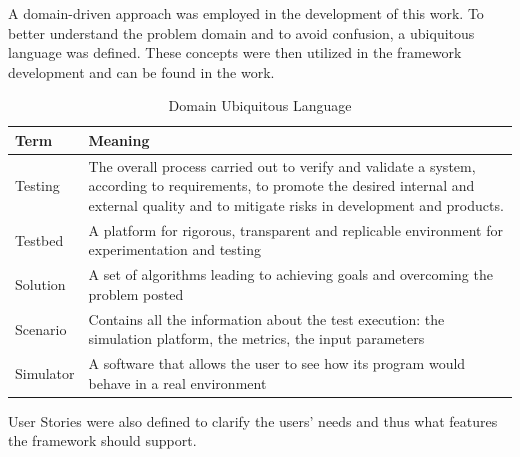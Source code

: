 \documentclass[12pt,a4paper,openright,twoside]{book}
\begin{document}
A domain-driven approach was employed in the development of this work.
To better understand the problem domain and to avoid confusion, a ubiquitous language was defined.
These concepts were then utilized in the framework development and can be found in the work.

\begin{table}[H]
  \centering
  \begin{tabular}{|l|p{}|}
    \toprule
    \textbf{Term} & \textbf{Meaning}                                                                                                                                                                                    \\
    \midrule
    Testing       & The overall process carried out to verify and validate a system, according to requirements, to promote the desired internal and external quality and to mitigate risks in development and products. \\ \hline
    Testbed       & A platform for rigorous, transparent and replicable environment for experimentation and testing                                                                                                     \\ \hline
    Solution      & A set of algorithms leading to achieving goals and overcoming the problem posted                                                                                                                    \\ \hline
    Scenario      & Contains all the information about the test execution: the simulation platform, the metrics, the input parameters                                                                                   \\ \hline
    Simulator     & A software that allows the user to see how its program would behave in a real environment                                                                                                           \\ \hline
  \end{tabular}
  \caption{Domain Ubiquitous Language}
\end{table}

User Stories were also defined to clarify the users' needs and thus what features the framework should support.
\end{document}
